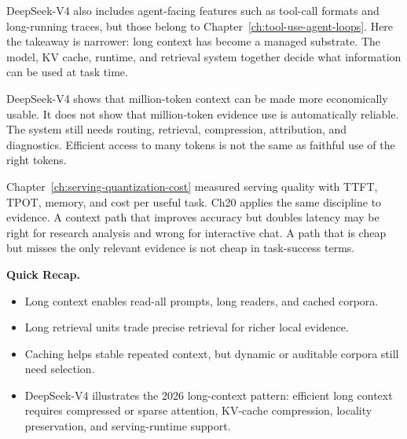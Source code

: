 DeepSeek-V4 also includes agent-facing features such as tool-call formats and long-running traces, but those belong to Chapter~\ref{ch:tool-use-agent-loops}. Here the takeaway is narrower: long context has become a managed substrate. The model, KV cache, runtime, and retrieval system together decide what information can be used at task time.

\begin{tcolorbox}[colback=blue!5, colframe=blue!40, title=\textbf{What DeepSeek-V4 Does Not Prove}]
DeepSeek-V4 shows that million-token context can be made more economically usable. It does not show that million-token evidence use is automatically reliable. The system still needs routing, retrieval, compression, attribution, and diagnostics. Efficient access to many tokens is not the same as faithful use of the right tokens.
\end{tcolorbox}

\begin{tcolorbox}[colback=gray!8, colframe=gray!40, title=\textbf{Echo from Ch19: Context Is Part of the Cost Model}]
Chapter~\ref{ch:serving-quantization-cost} measured serving quality with TTFT, TPOT, memory, and cost per useful task. Ch20 applies the same discipline to evidence. A context path that improves accuracy but doubles latency may be right for research analysis and wrong for interactive chat. A path that is cheap but misses the only relevant evidence is not cheap in task-success terms.
\end{tcolorbox}

\begin{quickrecap}
\textbf{Quick Recap.}
\begin{itemize}[nosep,leftmargin=1.5em]
  \item Long context enables read-all prompts, long readers, and cached corpora.
  \item Long retrieval units trade precise retrieval for richer local evidence.
  \item Caching helps stable repeated context, but dynamic or auditable corpora still need selection.
  \item DeepSeek-V4 illustrates the 2026 long-context pattern: efficient long context requires compressed or sparse attention, KV-cache compression, locality preservation, and serving-runtime support.
\end{itemize}
\end{quickrecap}


